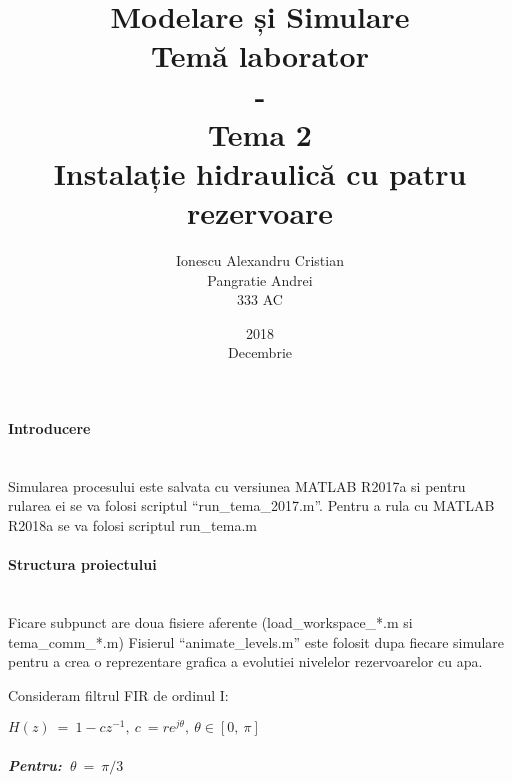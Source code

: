 \documentclass[12pt,english]{article}
\title{Modelare și Simulare\\Temă laborator\\-\\Tema 2\\Instalație hidraulică cu patru rezervoare}
\date{2018\\Decembrie}
\author{Ionescu Alexandru Cristian\\Pangratie Andrei\\333 AC}
\newcommand{\myparagraph}[1]{\paragraph{#1}\mbox{}\\}
\begin{document}
\maketitle

\pagebreak


\myparagraph {Introducere}
Simularea procesului este salvata cu versiunea MATLAB R2017a si pentru rularea ei se va folosi scriptul ``run_tema_2017.m''. Pentru a rula cu MATLAB R2018a se va folosi scriptul run_tema.m

\myparagraph {Structura proiectului}
Ficare subpunct are doua fisiere aferente (load_workspace_*.m si tema_comm_*.m)
Fisierul ``animate_levels.m'' este folosit dupa fiecare simulare pentru a crea o reprezentare grafica a evolutiei nivelelor rezervoarelor cu apa.

Consideram filtrul FIR de ordinul I:
\begin{center}
$\displaystyle H( z) \ =\ 1-cz^{-1} ,\ c\ =re^{j\theta } ,\ \theta \in [ 0,\ \pi ]$
\end{center}

\subparagraph {Pentru:\ $\displaystyle \theta \ =\ \pi /3$}

\end{document}
